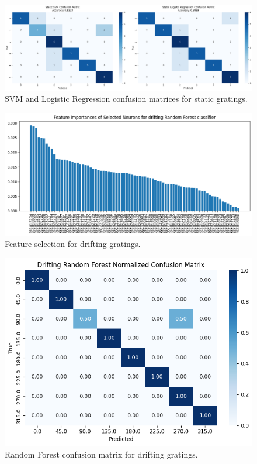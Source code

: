 \documentclass[10pt,twocolumn]{article}
\begin{document}
\begin{figure}[ht]
\centering
\includegraphics[width=\linewidth]{report_images/static_SVM_LogR_confusion_matrix.png}
\caption{SVM and Logistic Regression confusion matrices for static gratings.}
\label{fig:static_svm_logr_cm}
\end{figure}

\begin{figure}[ht]
\centering
\includegraphics[width=\linewidth]{report_images/drifting_feature_selection.png}
\caption{Feature selection for drifting gratings.}
\label{fig:drifting_feature}
\end{figure}

\begin{figure}[ht]
\centering
\includegraphics[width=\linewidth]{report_images/drifting_random_forest_confusion_matrix.png}
\caption{Random Forest confusion matrix for drifting gratings.}
\label{fig:drifting_rf_cm}
\end{figure}
\end{document}
